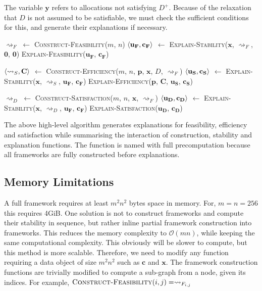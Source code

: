 The variable $\mathbf{y}$ refers to allocations not satisfying $D^+$. Because of the relaxation that $D$ is not assumed to be satisfiable, we must check the sufficient conditions for this, and generate their explanations if necessary.

\begin{algorithm}[H]
	\caption{}
	\begin{algorithmic}[1]
			\State $\rightsquigarrow_F$ $\gets$ \textsc{Construct-Feasibility}($m$, $n$)
			\State $\langle{\mathbf{u_F}},{\mathbf{c_F}}\rangle$ $\gets$ \textsc{Explain-Stability}($\mathbf{x}$, $\rightsquigarrow_F$, $\mathbf{0}$, $\mathbf{0}$)
			\State\textsc{Explain-Feasibility}($\mathbf{u_F}$, $\mathbf{c_F}$)

			\State $\langle{\rightsquigarrow_S},{\mathbf{C}}\rangle$ $\gets$ \textsc{Construct-Efficiency}($m$, $n$, $\mathbf{p}$, $\mathbf{x}$, $D$, $\rightsquigarrow_F$)
			\State $\langle{\mathbf{u_S}},{\mathbf{c_S}}\rangle$ $\gets$ \textsc{Explain-Stability}($\mathbf{x}$, $\rightsquigarrow_S$, $\mathbf{u_F}$, $\mathbf{c_F}$)
			\State\textsc{Explain-Efficiency}($\mathbf{p}$, $\mathbf{C}$, $\mathbf{u_S}$, $\mathbf{c_S}$)

			\State $\rightsquigarrow_D$ $\gets$ \textsc{Construct-Satisfaction}($m$, $n$, $\mathbf{x}$, $\rightsquigarrow_F$)
			\State $\langle{\mathbf{u_D}},{\mathbf{c_D}}\rangle$ $\gets$ \textsc{Explain-Stability}($\mathbf{x}$, $\rightsquigarrow_D$, $\mathbf{u_F}$, $\mathbf{c_F}$)
			\State\textsc{Explain-Satisfaction}($\mathbf{u_D}$, $\mathbf{c_D}$)
		\EndFunction
	\end{algorithmic}
\end{algorithm}

The above high-level algorithm generates explanations for feasibility, efficiency and satisfaction while summarising the interaction of construction, stability and explanation functions. The function is named with full precomputation because all frameworks are fully constructed before explanations.

\subsection{Memory Limitations}

A full framework requires at least $m^2n^2$ bytes space in memory. For, $m=n=256$ this requires 4GiB. One solution is not to construct frameworks and compute their stability in sequence, but rather inline partial framework construction into frameworks. This reduces the memory complexity to $\mathcal{O}(mn)$, while keeping the same computational complexity. This obviously will be slower to compute, but this method is more scalable. Therefore, we need to modify any function requiring a data object of size $m^2n^2$ such as $\mathbf{c}$ and $\mathbf{x}$.
\linespace
The framework construction functions are trivially modified to compute a sub-graph from a node, given its indices. For example, $\textsc{Construct-Feasibility}(i,j)=\rightsquigarrow_{F_{i,j}}$

